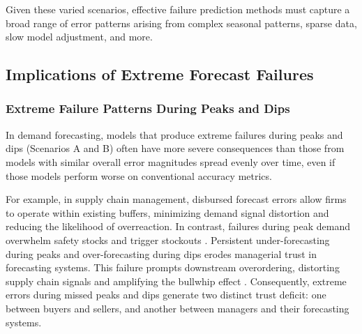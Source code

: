 \documentclass[12pt]{article}
\begin{document}
Given these varied scenarios, effective failure prediction methods must capture a broad range of error patterns arising from complex seasonal patterns, sparse data, slow model adjustment, and more.


%

\def\spacingset#1{\renewcommand{\baselinestretch}%
{#1}\small\normalsize} \spacingset{1}

\spacingset{1.75} %

\subsection{Implications of Extreme Forecast Failures}

\subsubsection{Extreme Failure Patterns During Peaks and Dips}

In demand forecasting, models that produce extreme failures during peaks and dips (Scenarios A and B) often have more severe consequences than those from models with similar overall error magnitudes spread evenly over time, even if those models perform worse on conventional accuracy metrics. 

For example, in supply chain management, disbursed forecast errors allow firms to operate within existing buffers, minimizing demand signal distortion and reducing the likelihood of overreaction. In contrast, failures during peak demand overwhelm safety stocks and trigger stockouts \citep{bray2019}. Persistent under-forecasting during peaks and over-forecasting during dips erodes managerial trust in forecasting systems. This failure prompts downstream overordering, distorting supply chain signals and amplifying the bullwhip effect \citep{croson2014, wu2006}. Consequently, extreme errors during missed peaks and dips generate two distinct trust deficit: one between buyers and sellers, and another between managers and their forecasting systems.

\end{document}

